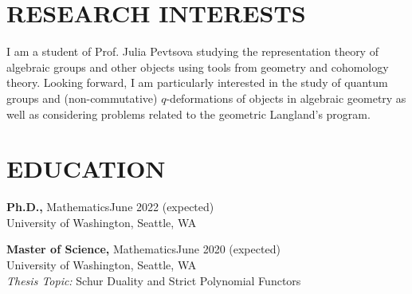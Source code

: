 \documentclass[margin]{res} %
\begin{document}
\begin{resume}

 
\section{RESEARCH INTERESTS}  

I am a student of Prof. Julia Pevtsova studying the representation theory of algebraic groups and 
other objects using tools from geometry and cohomology theory. Looking forward, I am particularly
interested in the study of quantum groups and (non-commutative) $q$-deformations of objects in algebraic 
geometry as well as considering problems related to the geometric Langland's program.




\section{EDUCATION}

{\bf Ph.D.,} Mathematics\hfill June 2022 (expected) \\
University of Washington, Seattle, WA

{\bf Master of Science,} Mathematics\hfill June 2020 (expected) \\
University of Washington, Seattle, WA \\
{\it Thesis Topic:} Schur Duality and Strict Polynomial Functors


\end{resume}
\end{document}

